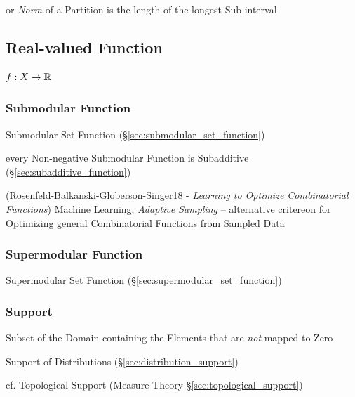 or \emph{Norm} of a Partition is the length of the longest Sub-interval



\subsection{Real-valued Function}\label{sec:real_valued}

$f : X \rightarrow \mathbb{R}$



\subsubsection{Submodular Function}\label{sec:submodular_function}

\fist Submodular Set Function (\S\ref{sec:submodular_set_function})

every Non-negative Submodular Function is Subadditive
(\S\ref{sec:subadditive_function})

(Rosenfeld-Balkanski-Globerson-Singer18 - \emph{Learning to Optimize
  Combinatorial Functions}) Machine Learning; \emph{Adaptive Sampling} --
alternative critereon for Optimizing general Combinatorial Functions from
Sampled Data



\subsubsection{Supermodular Function}\label{sec:supermodular_function}

\fist Supermodular Set Function (\S\ref{sec:supermodular_set_function})



\subsubsection{Support}\label{sec:support}

Subset of the Domain containing the Elements that are \emph{not} mapped to Zero

\fist Support of Distributions (\S\ref{sec:distribution_support})

cf. Topological Support (Measure Theory \S\ref{sec:topological_support})



